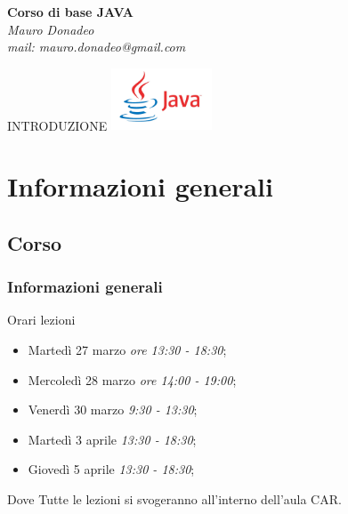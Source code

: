 \begin{frame}
	\begin{block}{}
		\begin{center}
			{\large\textbf{Corso di base JAVA}}\\
			\itshape{Mauro Donadeo}\\
			mail: mauro.donadeo@gmail.com
		\end{center}
	\end{block}
	\begin{block}{}	
		\begin{center}
			\large{INTRODUZIONE}
			\includegraphics[width = 30mm]{images/java-logo.jpg}
		\end{center}
	\end{block}	
\end{frame}

\section{Informazioni generali}
\subsection{Corso}
\begin{frame}
\frametitle{Informazioni generali}
\begin{block}{Orari lezioni}
\begin{itemize}
\item Martedì 27 marzo {\itshape ore 13:30 - 18:30};
\item Mercoledì 28 marzo {\itshape ore 14:00 - 19:00};
\item Venerdì 30 marzo {\itshape 9:30 - 13:30};
\item Martedì 3 aprile {\itshape 13:30 - 18:30};
\item Giovedì 5 aprile {\itshape 13:30 - 18:30};
\end{itemize}
\end{block}
\begin{block}{Dove}
Tutte le lezioni si svogeranno all'interno dell'aula CAR.
\end{block}
\end{frame}

